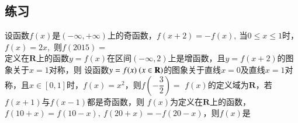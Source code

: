 \documentclass{BHCexam}
\begin{document}
\subsection*{练习}
\begin{questions}

\qs 设函数$f(x)$是$ \left(-\infty,+\infty\right) $上的奇函数，$ f(x+2)=-f(x) ,~$当$ 0\le x\le 1 $时，$f(x)=2x$,~则$f(2015)=$\\\mbox{\hspace{1em}}\hfill\xx
{}
\qs 定义在$ \mathbf{R} $上的函数$ y=f(x) $在区间$ \left(-\infty,2\right) $上是增函数，且$ y=f(x+2) $的图象关于$ x=1 $对称，则\xx
{}
\qs 设函数$y=f(x)~(x\in\mathbf{R})$的图象关于直线$ x=0 $及直线$ x=1 $对称，且$ x\in \left[0,1\right] $时，$f(x)=x^2$，则$ f\left(-\dfrac{3}{2}\right) =$\xx
{}
\qs $f(x)$的定义域为$\mathbf{R}$，若$f(x+1)$与$f(x-1)$都是奇函数，则\xx
{} 
\qs $f(x)$为定义在$ \mathbf{R} $上的函数，$ f(10+x)=f(10-x) ,~f(20+x)=-f(20-x)$，则$f(x)$是\xx
{} 


\end{questions}
\end{document}
